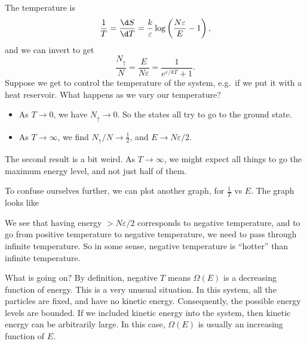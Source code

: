 \documentclass[a4paper]{article}
\begin{document}
\begin{eg}
\begin{center}
  \end{center}
  The temperature is
  \[
    \frac{1}{T} = \frac{\d S}{\d T} = \frac{k}{\varepsilon} \log \left(\frac{N \varepsilon}{E} - 1\right),
  \]
  and we can invert to get
  \[
    \frac{N_{\uparrow}}{N} = \frac{E}{N\varepsilon} = \frac{1}{e^{\varepsilon /kT} + 1}.
  \]
  Suppose we get to control the temperature of the system, e.g.\ if we put it with a heat reservoir. What happens as we vary our temperature?
  \begin{itemize}
    \item As $T \to 0$, we have $N_\uparrow \to 0$. So the states all try to go to the ground state.
    \item As $T \to \infty$, we find $N_\uparrow/N \to \frac{1}{2}$, and $E \to N\varepsilon/2$.
  \end{itemize}
  The second result is a bit weird. As $T \to \infty$, we might expect all things to go the maximum energy level, and not just half of them.

  To confuse ourselves further, we can plot another graph, for $\frac{1}{T}$ vs $E$. The graph looks like
  \begin{center}
  \end{center}
  We see that having energy $> N\varepsilon/2$ corresponds to negative temperature, and to go from positive temperature to negative temperature, we need to pass through infinite temperature. So in some sense, negative temperature is ``hotter'' than infinite temperature.

  What is going on? By definition, negative $T$ means $\Omega(E)$ is a decreasing function of energy. This is a very unusual situation. In this system, all the particles are fixed, and have no kinetic energy. Consequently, the possible energy levels are bounded. If we included kinetic energy into the system, then kinetic energy can be arbitrarily large. In this case, $\Omega(E)$ is usually an increasing function of $E$.


\end{eg}
\end{document}
